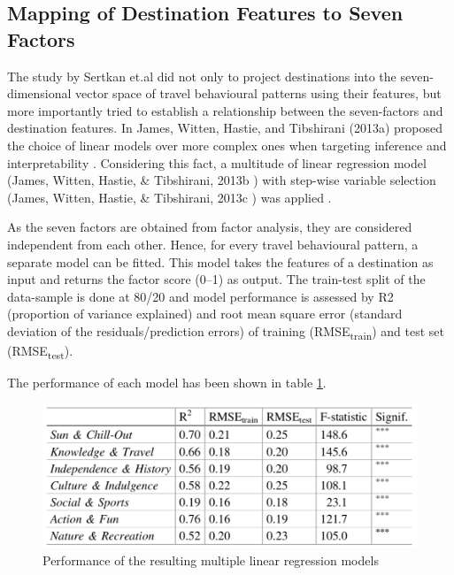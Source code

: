 \subsection{Mapping of Destination Features to Seven Factors}

The study by Sertkan et.al did not only to project destinations into the seven-dimensional vector space of travel behavioural patterns using their features, but more importantly tried to establish a relationship between the seven-factors and destination features.
In James, Witten, Hastie, and Tibshirani (2013a) proposed the choice of linear models over more complex ones when targeting inference and interpretability \cite{james2013introduction}. Considering this fact, a multitude of linear regression model (James, Witten, Hastie, \& Tibshirani, 2013b \cite{james2013introduction}) with step-wise variable selection (James, Witten, Hastie, \& Tibshirani, 2013c \cite{james2013introduction}) was applied \cite{sertkan2018mapping}. 

As the seven factors are obtained from factor analysis, they are considered independent from each other. Hence, for every travel behavioural pattern, a separate model can be fitted. This model takes the features of a destination as input and returns the factor score (0–1) as output.
The train-test split of the data-sample is done at 80/20 and model performance is assessed by R2 (proportion of variance explained) and root mean square error (standard deviation of the residuals/prediction errors) of training (RMSE\textsubscript{train}) and test set (RMSE\textsubscript{test}).

The performance of each model has been shown in table \ref{fig:table3}.

\begin{figure}
  \includegraphics[width=\linewidth]{latex_files/figures/table3.png}
  \caption{Performance of the resulting multiple linear regression models \cite{sertkan2018mapping}}
  \label{fig:table3}
\end{figure}


